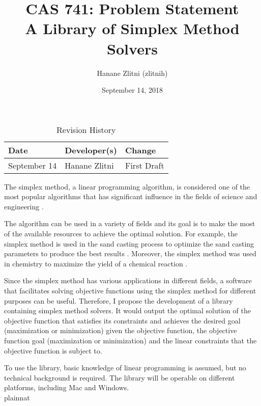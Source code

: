 \documentclass{article}
\title{CAS 741: Problem Statement\\A Library of Simplex Method Solvers}
\author{Hanane Zlitni (zlitnih)}
\date{September 14, 2018}
\begin{document}
\maketitle

\begin{table}[hp]
\caption{Revision History} \label{TblRevisionHistory}
\begin{tabularx}{\textwidth}{llX}
\toprule
\textbf{Date} & \textbf{Developer(s)} & \textbf{Change}\\
\midrule
September 14 & Hanane Zlitni & First Draft\\
\bottomrule
\end{tabularx}
\end{table}

The simplex method, a linear programming algorithm, is considered one of the most popular algorithms that has significant influence in the fields of science and engineering 
\cite{simplex-popularity}. \par 

The algorithm can be used in a variety of fields and its goal is to make the most of the available resources to achieve the optimal solution. For example, the simplex method is 
used in the sand casting process to optimize the sand casting parameters to produce the best results \cite{sand-casting}. Moreover, the simplex method was used in chemistry to 
maximize the yield of a chemical reaction \cite{chemistry}. \par

Since the simplex method has various applications in different fields, a software that facilitates solving objective functions using the simplex method for different purposes can be 
useful. Therefore, I propose the development of a library containing simplex method solvers. It would output the optimal solution of the objective function that satisfies its 
constraints and achieves the desired goal (maximization or minimization) given the objective function, the objective function goal (maximization or minimization) and the linear 
constraints that the objective function is subject to. \par 

To use the library, basic knowledge of linear programming is assumed, but no technical background is required. The library will be operable on different platforms, including Mac 
and Windows. \\


 {plainnat}

\end{document}
